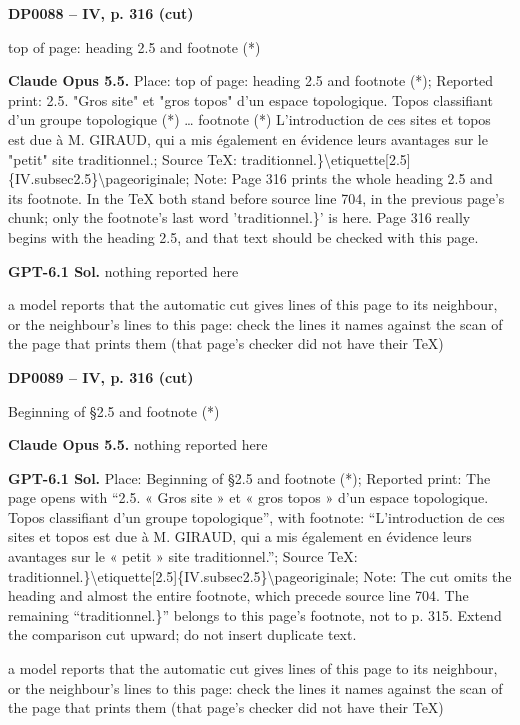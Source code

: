 \par\noindent\hypertarget{DP0088}{}\textbf{DP0088 -- IV, p. 316 (cut)}\par
top of page: heading 2.5 and footnote (*)\par
\textbf{Claude Opus 5.5.} Place: top of page: heading 2.5 and footnote (*); Reported print: 2.5. "Gros site" et "gros topos" d'un espace topologique. Topos classifiant d'un groupe topologique (*) … footnote (*) L'introduction de ces sites et topos est due à M. GIRAUD, qui a mis également en évidence leurs avantages sur le "petit" site traditionnel.; Source TeX: traditionnel.\}\textbackslash{}etiquette[2.5]\{IV.subsec2.5\}\textbackslash{}pageoriginale; Note: Page 316 prints the whole heading 2.5 and its footnote. In the TeX both stand before source line 704, in the previous page's chunk; only the footnote's last word 'traditionnel.\}' is here. Page 316 really begins with the heading 2.5, and that text should be checked with this page.\par
\textbf{GPT-6.1 Sol.} nothing reported here\par
a model reports that the automatic cut gives lines of this page to its neighbour, or the neighbour's lines to this page: check the lines it names against the scan of the page that prints them (that page's checker did not have their TeX)\par
\par\noindent\hypertarget{DP0089}{}\textbf{DP0089 -- IV, p. 316 (cut)}\par
Beginning of §2.5 and footnote (*)\par
\textbf{Claude Opus 5.5.} nothing reported here\par
\textbf{GPT-6.1 Sol.} Place: Beginning of §2.5 and footnote (*); Reported print: The page opens with “2.5. « Gros site » et « gros topos » d'un espace topologique. Topos classifiant d'un groupe topologique”, with footnote: “L'introduction de ces sites et topos est due à M. GIRAUD, qui a mis également en évidence leurs avantages sur le « petit » site traditionnel.”; Source TeX: traditionnel.\}\textbackslash{}etiquette[2.5]\{IV.subsec2.5\}\textbackslash{}pageoriginale; Note: The cut omits the heading and almost the entire footnote, which precede source line 704. The remaining “traditionnel.\}” belongs to this page's footnote, not to p. 315. Extend the comparison cut upward; do not insert duplicate text.\par
a model reports that the automatic cut gives lines of this page to its neighbour, or the neighbour's lines to this page: check the lines it names against the scan of the page that prints them (that page's checker did not have their TeX)\par
